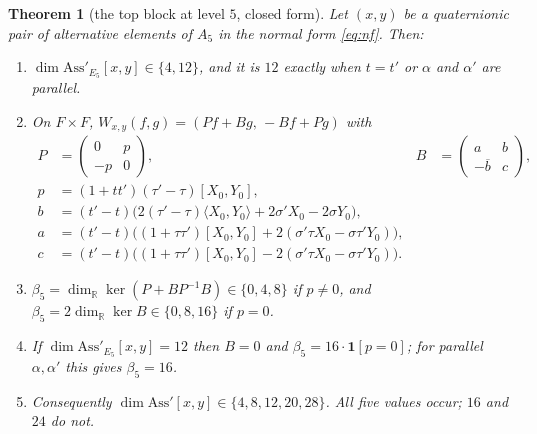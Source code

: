 \documentclass{baustms}
\theoremstyle{cupthm}
\newtheorem{thm}{Theorem}[section]
\numberwithin{equation}{section}
\newcommand{\Ass}{\mathrm{Ass}}
\newcommand{\RR}{\mathbb{R}}
\newcommand{\one}[1]{\mathbf{1}[#1]}
\begin{document}
\begin{thm}[the top block at level $5$, closed form]\label{thm:3}
Let $(x,y)$ be a quaternionic pair of alternative elements of $A_5$ in the normal form \eqref{eq:nf}. Then:
\begin{enumerate}
\item[\rm(i)] $\dim\Ass'_{E_5}[x,y]\in\{4,12\}$, and it is $12$ exactly when $t=t'$ or $\alpha$ and $\alpha'$ are parallel.
\item[\rm(ii)] On $F\times F$, $W_{x,y}(f,g)=(Pf+Bg,\,-Bf+Pg)$ with
\begin{align*}
P&=\begin{pmatrix}0&p\\ -p&0\end{pmatrix},&
B&=\begin{pmatrix}a&b\\ -\overline{b}&c\end{pmatrix},\\
p&=(1+tt')(\tau'-\tau)[X_0,Y_0],\\
b&=(t'-t)\bigl(2(\tau'-\tau)\langle X_0,Y_0\rangle+2\sigma' X_0-2\sigma Y_0\bigr),\\
a&=(t'-t)\bigl((1+\tau\tau')[X_0,Y_0]+2(\sigma'\tau X_0-\sigma\tau' Y_0)\bigr),\\
c&=(t'-t)\bigl((1+\tau\tau')[X_0,Y_0]-2(\sigma'\tau X_0-\sigma\tau' Y_0)\bigr).
\end{align*}
\item[\rm(iii)] $\beta_5=\dim_{\RR}\ker(P+BP^{-1}B)\in\{0,4,8\}$ if $p\neq 0$, and $\beta_5=2\dim_{\RR}\ker B\in\{0,8,16\}$ if $p=0$.
\item[\rm(iv)] If $\dim\Ass'_{E_5}[x,y]=12$ then $B=0$ and $\beta_5=16\cdot\one{p=0}$; for parallel $\alpha,\alpha'$ this gives $\beta_5=16$.
\item[\rm(v)] Consequently $\dim\Ass'[x,y]\in\{4,8,12,20,28\}$. All five values occur; $16$ and $24$ do not.
\end{enumerate}
\end{thm}
\end{document}
